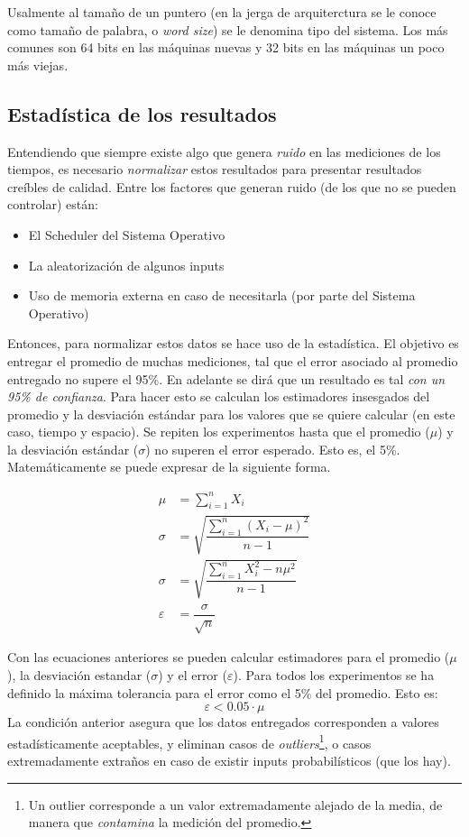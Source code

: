 \documentclass[12pt,letterpaper]{report}
\begin{document}
Usalmente al tamaño de un puntero (en la jerga de arquiterctura se le conoce como tamaño de palabra, o \emph{word size}) se le denomina tipo del sistema. Los más comunes son 64 bits en las máquinas nuevas y 32 bits en las máquinas un poco más viejas.

\subsection{Estadística de los resultados}
\label{subsec:estadistica}

Entendiendo que siempre existe algo que genera \emph{ruido} en las mediciones de los tiempos, es necesario \emph{normalizar} estos resultados para presentar resultados creíbles de calidad. Entre los factores que generan ruido (de los que no se pueden controlar) están:

\begin{itemize}
\item El Scheduler del Sistema Operativo
\item La aleatorización de algunos inputs
\item Uso de memoria externa en caso de necesitarla (por parte del Sistema Operativo)
\end{itemize}

Entonces, para normalizar estos datos se hace uso de la estadística. El objetivo es entregar el promedio de muchas mediciones, tal que el error asociado al promedio entregado no supere el 95\%. En adelante se dirá que un resultado es tal \emph{con un 95\% de confianza}. Para hacer esto se calculan los estimadores insesgados del promedio y la desviación estándar para los valores que se quiere calcular (en este caso, tiempo y espacio). Se repiten los experimentos hasta que el promedio ($\mu$) y la desviación estándar ($\sigma$) no superen el error esperado. Esto es, el 5\%. Matemáticamente se puede expresar de la siguiente forma.

\begin{align}
  \mu &= \sum_{i=1}^n X_i \nonumber \\
  \sigma &= \sqrt{\dfrac{\sum_{i=1}^n (X_i - \mu)^{2}}{n-1}} \nonumber \\
  \sigma &= \sqrt{\dfrac{\sum_{i=1}^n X_i^2 - n\mu^2}{n-1}} \nonumber \\
  \varepsilon &= \dfrac{\sigma}{\sqrt{n}} \nonumber
\end{align}

Con las ecuaciones anteriores se pueden calcular estimadores para el promedio ($\mu$), la desviación estandar ($\sigma$) y el error ($\varepsilon$). Para todos los experimentos se ha definido la máxima tolerancia para el error como el 5\% del promedio. Esto es:
$$\varepsilon < 0.05\cdot \mu$$
La condición anterior asegura que los datos entregados corresponden a valores estadísticamente aceptables, y eliminan casos de \emph{outliers}\footnote{Un outlier corresponde a un valor extremadamente alejado de la media, de manera que \emph{contamina} la medición del promedio.}, o casos extremadamente extraños en caso de existir inputs probabilísticos (que los hay).
\end{document}

